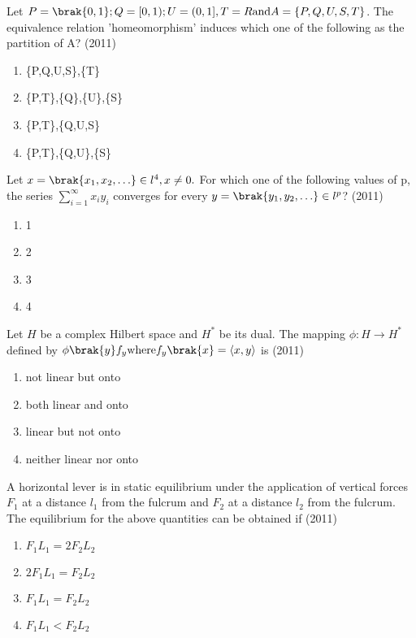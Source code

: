     \item Let $P = \brak{0,1}; Q=[0,1); U = (0,1], T = R \text{and} A = \{P,Q,U,S,T\}$. The equivalence relation 'homeomorphism' induces which one of the following as the partition of A?   \hfill (2011)
    \begin{enumerate}[label=(\Alph*)]
        \item \{P,Q,U,S\},\{T\}
        \item \{P,T\},\{Q\},\{U\},\{S\}
        \item \{P,T\},\{Q,U,S\}
        \item \{P,T\},\{Q,U\},\{S\}
    \end{enumerate}
    \item Let $x =\brak{x_1, x_2,\ldots}\in l^4, x\neq 0.$ For which one of the following values of p, the series $\sum_{i=1}^{\infty}x_iy_i$ converges for every $y=\brak{y_1,y_2,\ldots}\in l^p$?  \hfill (2011)
    \begin{enumerate}[label=(\Alph*)]
        \item 1
        \item 2
        \item 3
        \item 4
    \end{enumerate} 
    \item Let $H$ be a complex Hilbert space and $H^*$ be its dual. The mapping $\phi:H\rightarrow H^*$ defined by $\phi\brak{y}f_y \text{where} f_y\brak{x} = \langle x,y \rangle$ is   \hfill (2011)
    \begin{enumerate}[label=(\Alph*)]
        \item not linear but onto
        \item both linear and onto
        \item linear but not onto
        \item neither linear nor onto
    \end{enumerate}
    \item A horizontal lever is in static equilibrium under the application of vertical forces $F_1$ at a distance $l_1$ from the fulcrum and $F_2$ at a distance $l_2$ from the fulcrum. The equilibrium for the above quantities can be obtained if  \hfill (2011)
     \begin{enumerate}[label=(\Alph*)]
        \item $F_1L_1 = 2F_2L_2$
        \item $2F_1L_1 = F_2L_2$
        \item $F_1L_1 = F_2L_2$
        \item $F_1L_1 < F_2L_2$
     \end{enumerate}
